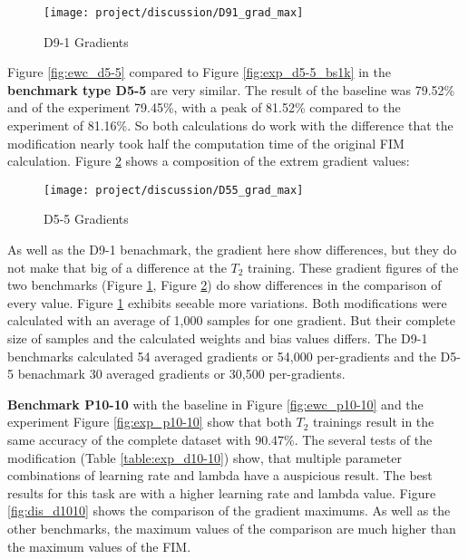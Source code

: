 \begin{figure}[H]
    \centering
    \texttt{[image: project/discussion/D91\_grad\_max]}
    \caption{D9-1 Gradients}
    \label{fig:dis_d91}
\end{figure}

\newpage

Figure \ref{fig:ewc_d5-5} compared to Figure \ref{fig:exp_d5-5_bs1k} in the \textbf{benchmark type D5-5} are very similar.
The result of the baseline was 79.52\% and of the experiment 79.45\%, with a peak of 81.52\% compared to the experiment of 81.16\%.
So both calculations do work with the difference that the modification nearly took half the computation time of the original FIM calculation.
Figure \ref{fig:dis_d55} shows a composition of the extrem gradient values:

\begin{figure}[H]
    \centering
    \texttt{[image: project/discussion/D55\_grad\_max]}
    \caption{D5-5 Gradients}
    \label{fig:dis_d55}
\end{figure}

As well as the D9-1 benachmark, the gradient here show differences, but they do not make that big of a difference at the $T_2$ training.
\newline
These gradient figures of the two benchmarks (Figure \ref{fig:dis_d91}, Figure \ref{fig:dis_d55}) do show differences in the comparison of every value.
Figure \ref{fig:dis_d91} exhibits seeable more variations.
Both modifications were calculated with an average of 1,000 samples for one gradient.
But their complete size of samples and the calculated weights and bias values differs.
The D9-1 benchmarks calculated 54 averaged gradients or 54,000 per-gradients and the D5-5 benachmark 30 averaged gradients or 30,500 per-gradients.

\newpage

\textbf{Benchmark P10-10} with the baseline in Figure \ref{fig:ewc_p10-10} and the experiment Figure \ref{fig:exp_p10-10} show that both $T_2$ trainings result in the same accuracy of the complete dataset with 90.47\%.
\newline
The several tests of the modification (Table \ref{table:exp_d10-10}) show, that multiple parameter combinations of learning rate and lambda have a auspicious result.
The best results for this task are with a higher learning rate and lambda value.
\newline
Figure \ref{fig:dis_d1010} shows the comparison of the gradient maximums.
As well as the other benchmarks, the maximum values of the comparison are much higher than the maximum values of the FIM.


